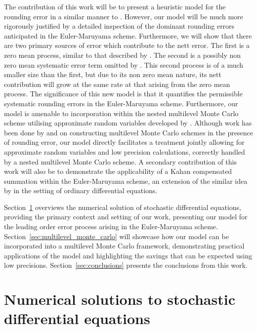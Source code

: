 \documentclass[manuscript,review]{acmart}
\begin{document}
The contribution of this work will be to present a heuristic model for the rounding error in a similar manner to \citet{arciniega2003rounding}. However, our model will be much more rigorously justified by a detailed inspection of the dominant rounding errors anticipated in the Euler-Maruyama scheme. Furthermore, we will show that there are two primary sources of error which contribute to the nett error. The first is a zero mean process, similar to that described by \citet{arciniega2003rounding}. The second is a possibly non zero mean systematic error term omitted by \citet{arciniega2003rounding}. This second process is of a much smaller size than the first, but due to its non zero mean nature, its nett contribution will grow at the same rate at that arising from the zero mean process. The significance of this new model is that it quantifies the permissible systematic rounding errors in the Euler-Maruyama scheme. Furthermore, our model is amenable to incorporation within the nested multilevel Monte Carlo scheme utilising approximate random variables developed by \citeauthor{giles2020approximate} \citep{giles2020approximate,sheridan2020approximate_inverse,sheridan2020approximate_random,sheridan2020nested}. Although work has been done by \citet{brugger2014mixed} and \citet{omland2015exploiting} on constructing multilevel Monte Carlo schemes in the presence of rounding error, our model directly facilitates a treatment jointly allowing for approximate random variables and low precision calculations, correctly handled by a nested multilevel Monte Carlo scheme. A secondary contribution of this work will also be to demonstrate the applicability of a Kahan compensated summation within the Euler-Maruyama scheme, an extension of the similar idea by \citet{vitasek1969numerical} in the setting of ordinary differential equations. 

Section~\ref{sec:numerical_solutions_to_stochastic_differential_equations} overviews the numerical solution of stochastic differential equations, providing the primary context and setting of our work, presenting our model for the leading order error process arising in the Euler-Maruyama scheme. Section~\ref{sec:multilevel_monte_carlo} will showcase how our model can be incorporated into a multilevel Monte Carlo framework, demonstrating practical applications of the model and highlighting the savings that can be expected using low precisions. Section~\ref{sec:conclusions} presents the conclusions from this work. 

\section{Numerical solutions to stochastic differential equations}
\label{sec:numerical_solutions_to_stochastic_differential_equations}
\end{document}
